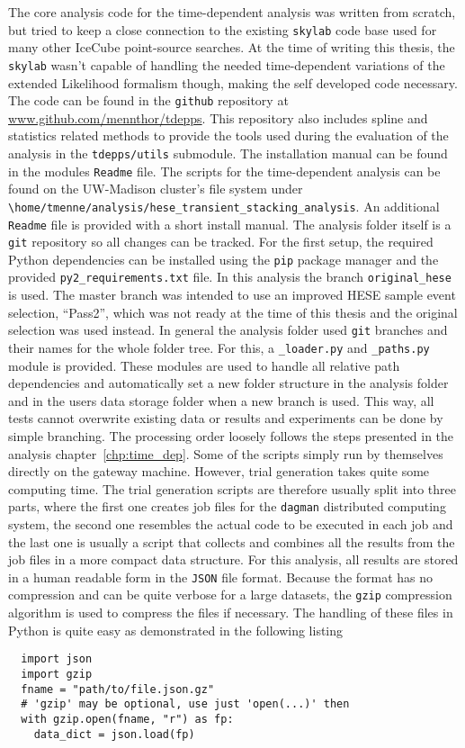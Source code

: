 The core analysis code for the time-dependent analysis was written from scratch, but tried to keep a close connection to the existing \lstinline!skylab! code base used for many other IceCube point-source searches.
At the time of writing this thesis, the \lstinline!skylab! wasn't capable of handling the needed time-dependent variations of the extended Likelihood formalism though, making the self developed code necessary.
The code can be found in the \lstinline!github! repository at \url{www.github.com/mennthor/tdepps}.
This repository also includes spline and statistics related methods to provide the tools used during the evaluation of the analysis in the \lstinline!tdepps/utils! submodule.
The installation manual can be found in the modules \lstinline!Readme! file.
The scripts for the time-dependent analysis can be found on the UW-Madison cluster's file system under \lstinline!\home/tmenne/analysis/hese_transient_stacking_analysis!.
An additional \lstinline!Readme! file is provided with a short install manual.
The analysis folder itself is a \lstinline!git! repository so all changes can be tracked.
For the first setup, the required Python dependencies can be installed using the \lstinline!pip! package manager and the provided \lstinline!py2_requirements.txt! file.
In this analysis the branch \lstinline!original_hese! is used.
The master branch was intended to use an improved HESE sample event selection, \enquote{Pass2}, which was not ready at the time of this thesis and the original selection was used instead.
In general the analysis folder used \lstinline!git! branches and their names for the whole folder tree.
For this, a \lstinline!_loader.py! and \lstinline!_paths.py! module is provided.
These modules are used to handle all relative path dependencies and automatically set a new folder structure in the analysis folder and in the users data storage folder when a new branch is used.
This way, all tests cannot overwrite existing data or results and experiments can be done by simple branching.
The processing order loosely follows the steps presented in the analysis chapter~\ref{chp:time_dep}.
Some of the scripts simply run by themselves directly on the gateway machine.
However, trial generation takes quite some computing time.
The trial generation scripts are therefore usually split into three parts, where the first one creates job files for the \lstinline!dagman! distributed computing system, the second one resembles the actual code to be executed in each job and the last one is usually a script that collects and combines all the results from the job files in a more compact data structure.
For this analysis, all results are stored in a human readable form in the \lstinline!JSON! file format.
Because the format has no compression and can be quite verbose for a large datasets, the \lstinline!gzip! compression algorithm is used to compress the files if necessary.
The handling of these files in Python is quite easy as demonstrated in the following listing
\begin{lstlisting}
  import json
  import gzip
  fname = "path/to/file.json.gz"
  # 'gzip' may be optional, use just 'open(...)' then
  with gzip.open(fname, "r") as fp:
    data_dict = json.load(fp)
\end{lstlisting}

